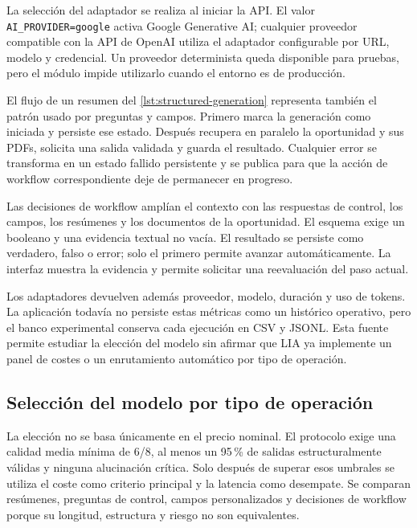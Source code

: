 La selección del adaptador se realiza al iniciar la API. El valor
\texttt{AI\_PROVIDER=google} activa Google Generative AI; cualquier proveedor
compatible con la API de OpenAI utiliza el adaptador configurable por URL,
modelo y credencial. Un proveedor determinista queda disponible para pruebas,
pero el módulo impide utilizarlo cuando el entorno es de producción.

El flujo de un resumen del \cref{lst:structured-generation} representa también
el patrón usado por preguntas y campos. Primero marca la generación como
iniciada y persiste ese estado. Después recupera en paralelo la oportunidad y
sus PDFs, solicita una salida validada y guarda el resultado. Cualquier error
se transforma en un estado fallido persistente y se publica para que la acción
de workflow correspondiente deje de permanecer en progreso.



Las decisiones de workflow amplían el contexto con las respuestas de control,
los campos, los resúmenes y los documentos de la oportunidad. El esquema exige
un booleano y una evidencia textual no vacía. El resultado se persiste como
verdadero, falso o error; solo el primero permite avanzar automáticamente. La
interfaz muestra la evidencia y permite solicitar una reevaluación del paso
actual.

Los adaptadores devuelven además proveedor, modelo, duración y uso de tokens.
La aplicación todavía no persiste estas métricas como un histórico operativo,
pero el banco experimental conserva cada ejecución en CSV y JSONL. Esta fuente
permite estudiar la elección del modelo sin afirmar que LIA ya implemente un
panel de costes o un enrutamiento automático por tipo de operación.

\subsection{Selección del modelo por tipo de operación}
\label{sec:ai-model-selection}

La elección no se basa únicamente en el precio nominal. El protocolo exige una
calidad media mínima de 6/8, al menos un 95\,\% de salidas estructuralmente
válidas y ninguna alucinación crítica. Solo después de superar esos umbrales
se utiliza el coste como criterio principal y la latencia como desempate. Se
comparan resúmenes, preguntas de control, campos personalizados y decisiones de
workflow porque su longitud, estructura y riesgo no son equivalentes.

